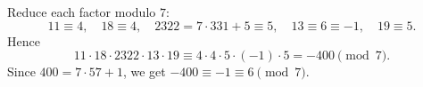 Reduce each factor modulo $7$:
\[11\equiv4,\quad18\equiv4,\quad2322=7\cdot331+5\equiv5,\quad13\equiv6\equiv-1,\quad19\equiv5.\]
Hence
\[11\cdot18\cdot2322\cdot13\cdot19\equiv4\cdot4\cdot5\cdot(-1)\cdot5=-400\pmod7.\]
Since $400=7\cdot57+1$, we get $-400\equiv-1\equiv\boxed{6}\pmod7$.

